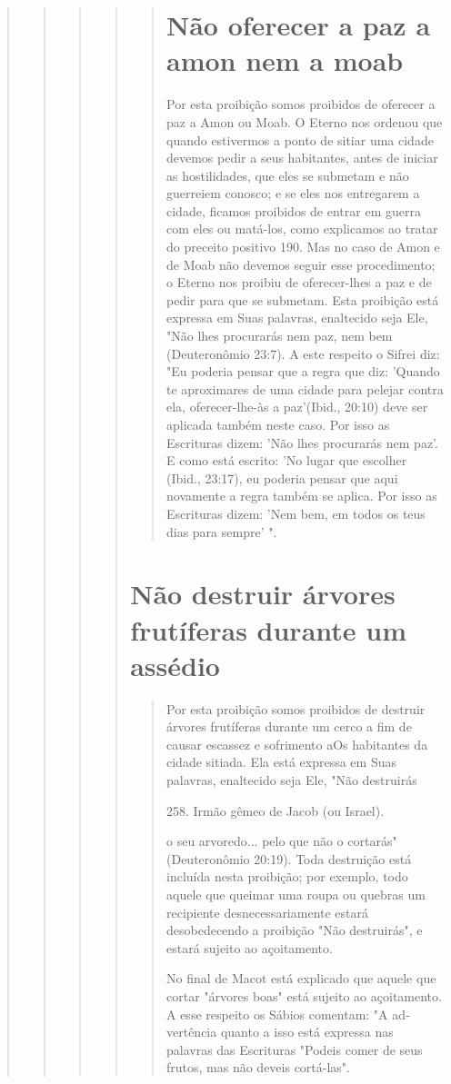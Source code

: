 \begin{quote}
\begin{quote}
\begin{quote}
\begin{quote}
\begin{quote}
\section{Não oferecer a paz a amon nem a moab}

Por esta proibição somos proibidos de oferecer a paz a Amon ou Moab. O
Eterno nos ordenou que quando estivermos a ponto de sitiar uma ci­dade
devemos pedir a seus habitantes, antes de iniciar as hostilidades, que
eles se submetam e não guerreiem conosco; e se eles nos entregarem a
cidade, fica­mos proibidos de entrar em guerra com eles ou matá-los,
como explicamos ao tratar do preceito positivo 190. Mas no caso de Amon
e de Moab não devemos seguir esse procedimento; o Eterno nos proibiu de
oferecer-lhes a paz e de pe­dir para que se submetam. Esta proibição
está expressa em Suas palavras, enal­tecido seja Ele, "Não lhes
procurarás nem paz, nem bem (Deuteronômio 23:7). A este respeito o
Sifrei diz: "Eu poderia pensar que a regra que diz: 'Quando te
aproximares de uma cidade para pelejar contra ela, oferecer-lhe-às a
paz'(Ibid., 20:10) deve ser aplicada também neste caso. Por isso as
Escrituras dizem: 'Não lhes procurarás nem paz'. E como está escrito:
'No lugar que escolher (Ibid., 23:17), eu poderia pensar que aqui
novamente a regra também se aplica. Por isso as Escrituras dizem: 'Nem
bem, em todos os teus dias para sempre' ".
\end{quote}

\section{Não destruir árvores frutíferas durante um assédio}

\begin{quote}
Por esta proibição somos proibidos de destruir árvores frutíferas
du­rante um cerco a fim de causar escassez e sofrimento aOs habitantes
da cidade sitiada. Ela está expressa em Suas palavras, enaltecido seja
Ele, "Não destruirás

258. Irmão gêmeo de Jacob (ou Israel).

o seu arvoredo... pelo que não o cortarás" (Deuteronômio 20:19). Toda
des­truição está incluída nesta proibição; por exemplo, todo aquele que
queimar uma roupa ou quebras um recipiente desnecessariamente estará
desobedecen­do a proibição "Não destruirás", e estará sujeito ao
açoitamento.

No final de Macot está explicado que aquele que cortar "árvores boas"
está sujeito ao açoitamento. A esse respeito os Sábios comentam: "A
ad­vertência quanto a isso está expressa nas palavras das Escrituras
"Podeis comer de seus frutos, mas não deveis cortá-las".


\end{quote}
\end{quote}
\end{quote}
\end{quote}
\end{quote}
